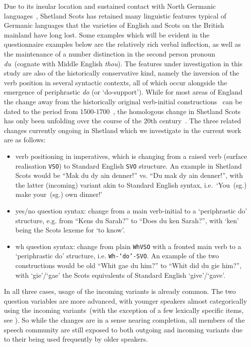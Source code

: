 Due to its insular location and sustained contact with North Germanic languages~\citep{Jamieson2016}, Shetland Scots has retained many linguistic features typical of Germanic languages that the varieties of English and Scots on the British mainland have long lost. Some examples which will be evident in the questionnaire examples below are the relatively rich verbal inflection, as well as the maintenance of a number distinction in the second person pronoun \emph{du}~(cognate with Middle English \emph{thou}). The features under investigation in this study are also of the historically conservative kind, namely the inversion of the verb position in several syntactic contexts, all of which occur alongside the emergence of periphrastic \emph{do} (or `do-support').
While for most areas of England the change away from the historically original verb-initial constructions~\citep[see][for a more detailed analysis]{Jamieson2015} can be dated to the period from 1500-1700~\citep{Ellegard1953,Kroch1989do}, the homologous change in Shetland Scots has only been unfolding over the course of the 20th century~\citep{Jonas2002}. %
The three related changes currently ongoing in Shetland which we investigate in the current work are as follows:

\begin{itemize}
\item verb positioning in imperatives, which is changing from a raised verb (surface realisation \texttt{VSO}) to Standard English \texttt{SVO} structure. An example in Shetland Scots would be ``Mak du dy ain denner!'' vs. ``Du mak dy ain denner!'', with the latter (incoming) variant akin to Standard English syntax, i.e.~`You~(sg.) make your~(sg.) own dinner!'

\item yes/no question syntax: change from a main verb-initial to a `periphrastic do' structure, e.g. from ``Kens du Sarah?'' to ``Does du ken Sarah?'', with `ken' being the Scots lexeme for `to know'.

\item wh question syntax: change from plain \texttt{WhVSO} with a fronted main verb to a `periphrastic do' structure, i.e. \texttt{Wh-`do'-SVO}. An example of the two constructions would be old ``Whit gae du him?'' to ``Whit did du gie him?'', with `gie'/`gae' the Scots equivalents of Standard English `give'/`gave'.
\end{itemize}

In all three cases, usage of the incoming variants is already common. The two question variables are more advanced, with younger speakers almost categorically using the incoming variants~(with the exception of a few lexically specific items, see \citealt{Jamieson2015}).
So while the changes are in a sense nearing completion, all members of the speech community are still exposed to both outgoing and incoming variants due to their being used frequently by older speakers.

